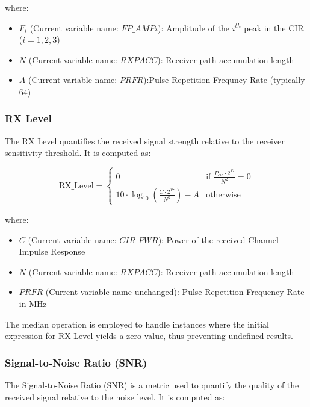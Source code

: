 where:

\begin{itemize}
  \item $F_i$ (Current variable name: $FP\_AMPi$): Amplitude of the $i^{th}$ peak in the CIR ($i = 1, 2, 3$)
  \item $N$ (Current variable name: $RXPACC$): Receiver path accumulation length
  \item $A$ (Current variable name: $PRFR$):Pulse Repetition Frequncy Rate (typically 64)
\end{itemize}

\subsubsection{RX Level}\label{rx_level}

The RX Level quantifies the received signal strength relative to the receiver sensitivity threshold. It is computed as:

\begin{equation}
  \text{RX\_Level} =
  \begin{cases}
    0 & \text{if } \frac{P_{cir} \cdot 2^{17}}{N^2} = 0 \\
    10 \cdot \log_{10} \left( \frac{C \cdot 2^{17}}{N^2} \right) - A & \text{otherwise}
  \end{cases}
\end{equation}

where:

\begin{itemize}
  \item $C$ (Current variable name: $CIR\_PWR$): Power of the received Channel Impulse Response
  \item $N$ (Current variable name: $RXPACC$): Receiver path accumulation length
  \item $PRFR$ (Current variable name unchanged): Pulse Repetition Frequency Rate in MHz
\end{itemize}

The median operation is employed to handle instances where the initial expression for RX Level yields a zero value, thus preventing undefined results.

\subsubsection{Signal-to-Noise Ratio (SNR)}\label{snr}

The Signal-to-Noise Ratio (SNR) is a metric used to quantify the quality of the received signal relative to the noise level. It is computed as:

